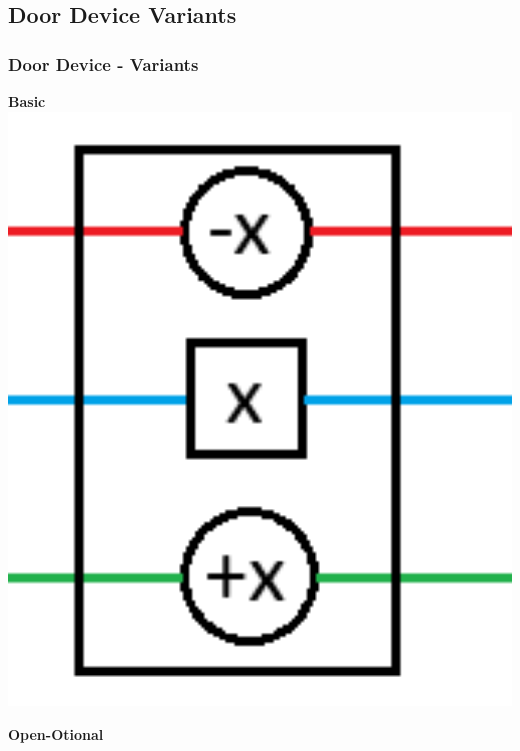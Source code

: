 \documentclass{beamer}
\begin{document}
\subsection{Door Device Variants}
\begin{frame}
  \frametitle{Door Device - Variants}
  \begin{minipage}[b]{0.32\textwidth}
    \textbf{Basic}
    \includegraphics[width=1\textwidth]{res/doors/DoorNormal.png}
  \end{minipage}
  \begin{minipage}[b]{0.32\textwidth}
    \textbf{Open-Otional}

\end{minipage}
\end{frame}
\end{document}
